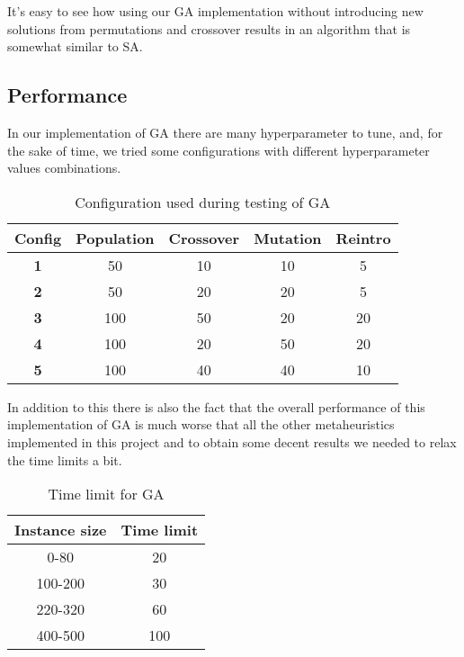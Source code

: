 It's easy to see how using our GA implementation without introducing new solutions from permutations and crossover results in an algorithm that is somewhat similar to SA.

\subsection{Performance}

In our implementation of GA there are many hyperparameter to tune, and, for the sake of time, we tried some configurations with different hyperparameter values combinations.

\begin{table}[H]
	\centering
	\begin{tabular}{|c|c|c|c|c|}
        \hline \textbf{Config} & \textbf{Population} & \textbf{Crossover} & \textbf{Mutation} & \textbf{Reintro} \\
		\hline \textbf{1} & 50 & 10 & 10 & 5 \\
		\hline \textbf{2} & 50 & 20 & 20 & 5 \\
        \hline \textbf{3} & 100 & 50 & 20 & 20 \\
        \hline \textbf{4} & 100 & 20 & 50 & 20 \\
        \hline \textbf{5} & 100 & 40 & 40 & 10 \\
        \hline
	\end{tabular}
    \vspace{2mm}    
	\caption{Configuration used during testing of GA} \label{tab:geneticConf}
\end{table}

In addition to this there is also the fact that the overall performance of this implementation of GA is much worse that all the other metaheuristics implemented in this project and to obtain some decent results we needed to relax the time limits a bit.

\begin{table}[htbp]
	\centering
	\begin{tabular}{|c|c|}
        \hline \textbf{Instance size} & \textbf{Time limit} \\
		\hline 0-80 & 20 \\
		\hline 100-200 & 30 \\
        \hline 220-320 & 60 \\
        \hline 400-500 & 100 \\
        \hline
	\end{tabular}
    \vspace{2mm}    
	\caption{Time limit for GA} \label{tab:geneticTlim}
\end{table}

